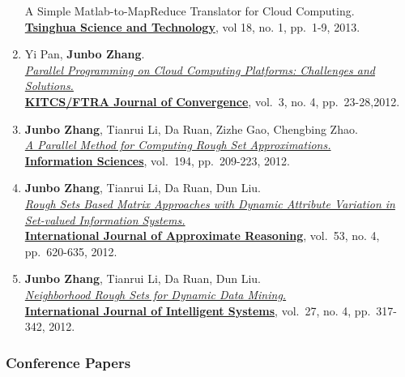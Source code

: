 \documentclass[]{article}
\begin{document}
\begin{enumerate}
{{  A Simple Matlab-to-MapReduce Translator for Cloud Computing.}}\\
  \href{http://qhxb.lib.tsinghua.edu.cn/english/}{\textbf{Tsinghua
  Science and Technology}}, vol 18, no. 1, pp.~1-9, 2013.
\item
  Yi Pan, \textbf{Junbo Zhang}.\\
  \href{http://www.ftrai.org/xe/index.php?mid=joc_published\&category=37964\&search_keyword=section\&search_target=title\&document_srl=38459}{\emph{Parallel
  Programming on Cloud Computing Platforms: Challenges and
  Solutions.}}\\ \href{http://www.ftrai.org/joc/}{\textbf{KITCS/FTRA
  Journal of Convergence}}, vol.~3, no. 4, pp.~23-28,2012.
\item
  \textbf{Junbo Zhang}, Tianrui Li, Da Ruan, Zizhe Gao, Chengbing
  Zhao.\\ \href{http://dx.doi.org/10.1016/j.ins.2011.12.036}{\emph{A
  Parallel Method for Computing Rough Set Approximations.}}\\
  \href{http://www.journals.elsevier.com/information-sciences}{\textbf{Information
  Sciences}}, vol.~194, pp.~209-223, 2012.
\item
  \textbf{Junbo Zhang}, Tianrui Li, Da Ruan, Dun Liu.\\
  \href{http://dx.doi.org/10.1016/j.ijar.2012.01.001}{\emph{Rough Sets
  Based Matrix Approaches with Dynamic Attribute Variation in Set-valued
  Information Systems.}}\\
  \href{http://www.journals.elsevier.com/international-journal-of-approximate-reasoning}{\textbf{International
  Journal of Approximate Reasoning}}, vol.~53, no. 4, pp.~620-635, 2012.
\item
  \textbf{Junbo Zhang}, Tianrui Li, Da Ruan, Dun Liu.\\
  \href{http://dx.doi.org/10.1002/int.21523}{\emph{Neighborhood Rough
  Sets for Dynamic Data Mining.}}\\
  \href{http://onlinelibrary.wiley.com/journal/10.1002/{[}ISSN{]}1098-111X}{\textbf{International
  Journal of Intelligent Systems}}, vol.~27, no. 4, pp.~317-342, 2012.
\end{enumerate}

\subsubsection{Conference Papers}\label{conference-papers}
\end{document}
